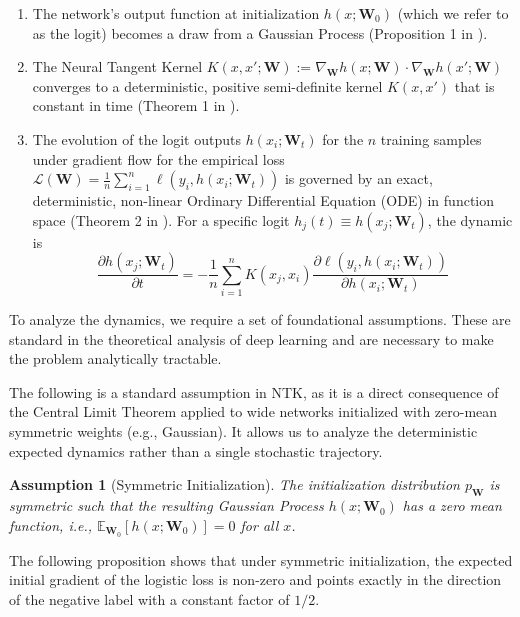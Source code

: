 \documentclass[letter,11pt]{article}
\newtheorem{assumption}{Assumption}
\begin{document}
\begin{enumerate}
    \item The network's output function at initialization $h(x; \mathbf{W}_0)$ (which we refer to as the logit) becomes a draw from a Gaussian Process (Proposition 1 in \citep{NTK_1}).
    \item The Neural Tangent Kernel $K(x, x'; \mathbf{W}) := \nabla_\mathbf{W} h(x; \mathbf{W}) \cdot \nabla_\mathbf{W} h(x'; \mathbf{W})$ converges to a deterministic, positive semi-definite kernel $K(x, x')$ that is constant in time (Theorem 1 in \citep{NTK_1}).
    \item The evolution of the logit outputs $h(x_i; \mathbf{W}_t)$ for the $n$ training samples under gradient flow for the empirical loss $\mathcal{L}(\mathbf{W}) = \frac{1}{n} \sum_{i=1}^n \ell(y_i, h(x_i; \mathbf{W}_t))$ is governed by an exact, deterministic, non-linear Ordinary Differential Equation (ODE) in function space (Theorem 2 in \citep{NTK_1}). For a specific logit $h_j(t) \equiv h(x_j; \mathbf{W}_t)$, the dynamic is
\begin{equation}\label{eq:flow_ode}
\frac{\partial h(x_j; \mathbf{W}_t)}{\partial t} = -\frac{1}{n} \sum_{i=1}^n K(x_j, x_i) \frac{\partial \ell(y_i, h(x_i; \mathbf{W}_t))}{\partial h(x_i; \mathbf{W}_t)}
\end{equation}
\end{enumerate}

To analyze the dynamics, we require a set of foundational assumptions. These are standard in the theoretical analysis of deep learning and are necessary to make the problem analytically tractable.

The following is a standard assumption in NTK, as it is a direct consequence of the Central Limit Theorem applied to wide networks initialized with zero-mean symmetric weights (e.g., Gaussian). It allows us to analyze the deterministic expected dynamics rather than a single stochastic trajectory.

\begin{assumption}[Symmetric Initialization]\label{assum:sym_init}
    The initialization distribution $p_\mathbf{W}$ is symmetric such that the resulting Gaussian Process $h(x; \mathbf{W}_0)$ has a zero mean function, i.e., $\mathbb{E}_{\mathbf{W}_0}[h(x; \mathbf{W}_0)] = 0$ for all $x$.
\end{assumption}

The following proposition shows that under symmetric initialization, the expected initial gradient of the logistic loss is non-zero and points exactly in the direction of the negative label with a constant factor of $1/2$.
\end{document}

